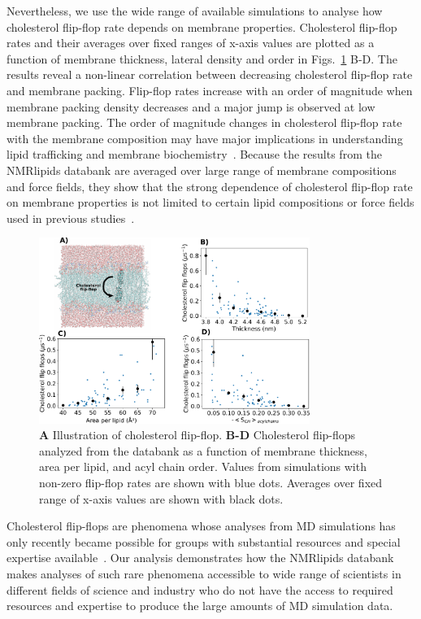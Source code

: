 \documentclass[fleqn,10pt]{wlscirep}
\begin{document}
Nevertheless, we use the wide range of available simulations to analyse how cholesterol flip-flop rate depends on membrane properties. Cholesterol flip-flop rates and their averages over fixed ranges of x-axis values are plotted as a function of membrane thickness, lateral density and order in Figs.~\ref{fig:flip-flops} B-D. The results reveal a non-linear correlation between decreasing cholesterol flip-flop rate and membrane packing. Flip-flop rates increase with an order of magnitude when membrane packing density decreases and a major jump is observed at low membrane packing. The order of magnitude changes in cholesterol flip-flop rate with the membrane composition may have major implications in understanding lipid trafficking and membrane biochemistry~\cite{gu19,baral20}. Because the results from the NMRlipids databank are averaged over large range of membrane compositions and force fields, they show that the strong dependence of cholesterol flip-flop rate on membrane properties is not limited to certain lipid compositions or force fields used in previous studies~\cite{gu19,javanainen19,baral20}.

\begin{figure}[htb]
    \centering
    \includegraphics[width=88mm]{Figures/CholFlipFlops.pdf}
    \caption{{\bf A} Illustration of cholesterol flip-flop.  
      {\bf B-D} Cholesterol flip-flops analyzed from the databank as a function of membrane thickness, area per lipid, and acyl chain order. Values from simulations with non-zero flip-flop rates are shown with blue dots. Averages over fixed range of x-axis values are shown with black dots.
    }
    \label{fig:flip-flops}
\end{figure}

Cholesterol flip-flops are phenomena whose analyses from MD simulations has only recently became possible for groups with substantial resources and special expertise available~\cite{gu19,javanainen19,baral20}. Our analysis demonstrates how the NMRlipids databank makes analyses of such rare phenomena accessible to wide range of scientists in different fields of science and industry who do not have the access to required resources and expertise to produce the large amounts of MD simulation data. 
\end{document}
